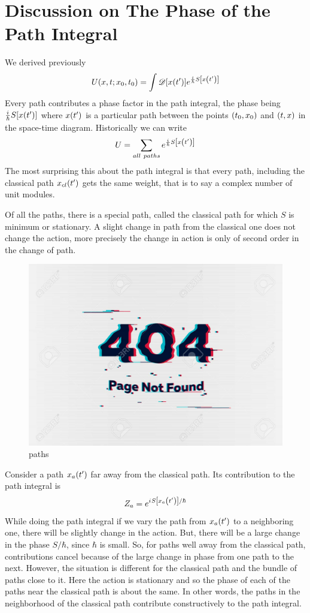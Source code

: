 		
		
		\section{Discussion on The Phase of the Path Integral}
		We derived previously
		\begin{equation}
			U\qty(x,t;x_0, t_0) = \int \mathcal{D}\qty[x\qty(t^\prime)] e^{\frac{{i\mkern1mu}}{\hbar} S\qty[x\qty(t^\prime)]}
		\end{equation}
		Every path contributes a phase factor in the path integral, the phase being $\frac{{i\mkern1mu}}{\hbar} S\qty[x\qty(t^\prime)]$ where $x\qty(t^\prime)$ is a particular path between the points $\qty(t_0, x_0)$ and $\qty(t,x)$ in the space-time diagram. Historically we can write
		\begin{equation}
			U = \sum_{all\ paths} e^{\frac{{i\mkern1mu}}{\hbar} S\qty[x\qty(t^\prime)]}
		\end{equation}
		The most surprising this about the path integral is that every path, including the classical path $x_{cl}\qty(t^\prime)$ gets the same weight, that is to say a complex number of unit modules.
		
		
		Of all the paths, there is a special path, called the classical path for which $S$ is minimum or stationary. A slight change in path from the classical one does not change the action, more precisely the change in action is only of second order in the change of path.
		
		
		\begin{figure}
			\centering
			\includegraphics[width=0.5\linewidth]{Pictures/not-found.jpg}
			\caption{paths}
		\end{figure}
	
	
	Consider a path $x_a\qty(t^\prime)$ far away from the classical path. Its contribution to the path integral is
	\begin{equation}
		Z_a = e^{{i\mkern1mu} S\qty[x_a\qty(t^\prime)] / \hbar}
	\end{equation}
	While doing the path integral if we vary the path from $x_a\qty(t^\prime)$ to a neighboring one, there will be slightly change in the action. But, there will be a large change in the phase $S/\hbar$, since $\hbar$ is small. So, for paths well away from the classical path, contributions cancel because of the large change in phase from one path to the next. However, the situation is different for the classical path and the bundle of paths close to it. Here the action is stationary and so the phase of each of the paths near the classical path is about the same. In other words, the paths in the neighborhood of the classical path contribute constructively to the path integral.
	
